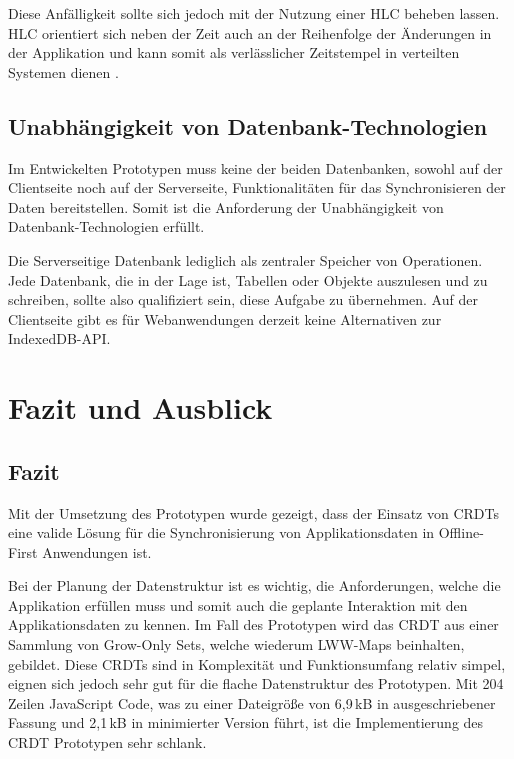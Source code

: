 \documentclass[a4paper, 12pt]{scrreprt}
\begin{document}
Diese Anfälligkeit sollte sich jedoch mit der Nutzung einer \ac{HLC} beheben lassen. \ac{HLC} orientiert sich neben der Zeit auch an der Reihenfolge der Änderungen in der Applikation und kann somit als verlässlicher Zeitstempel in verteilten Systemen dienen \autocite[S. 1]{InproceedingsHLC}. 


\section{Unabhängigkeit von Datenbank-Technologien}

Im Entwickelten Prototypen muss keine der beiden Datenbanken, sowohl auf der Clientseite noch auf der Serverseite, Funktionalitäten für das Synchronisieren der Daten bereitstellen. Somit ist die Anforderung der Unabhängigkeit von Datenbank-Technologien erfüllt. 

Die Serverseitige Datenbank lediglich als zentraler Speicher von Operationen. Jede Datenbank, die in der Lage ist, Tabellen oder Objekte auszulesen und zu schreiben, sollte also qualifiziert sein, diese Aufgabe zu übernehmen. Auf der Clientseite gibt es für Webanwendungen derzeit keine Alternativen zur IndexedDB-API. 


\chapter{Fazit und Ausblick}

\section{Fazit}

Mit der Umsetzung des Prototypen wurde gezeigt, dass der Einsatz von CRDTs eine valide Lösung für die Synchronisierung von Applikationsdaten in Offline-First Anwendungen ist.

Bei der Planung der Datenstruktur ist es wichtig, die Anforderungen, welche die Applikation erfüllen muss und somit auch die geplante Interaktion mit den Applikationsdaten zu kennen. Im Fall des Prototypen wird das CRDT aus einer Sammlung von Grow-Only Sets, welche wiederum LWW-Maps beinhalten, gebildet. Diese CRDTs sind in Komplexität und Funktionsumfang relativ simpel, eignen sich jedoch sehr gut für die flache Datenstruktur des Prototypen. Mit 204 Zeilen JavaScript Code, was zu einer Dateigröße von 6,9\,kB in ausgeschriebener Fassung und 2,1\,kB in minimierter Version führt, ist die Implementierung des CRDT Prototypen sehr schlank.
\end{document}
